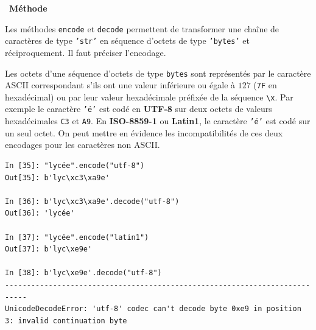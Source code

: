 \documentclass[a4paper, french, 12pt]{article}  %
\newenvironment{methode}[1]
{\par \medskip    \noindent  
 \begin {bclogo}[arrondi =0.1,logo=\bcoutil, marge=4,noborder = true] {~\textbf{Méthode}   {\itshape #1} }  \par}
{
\end{bclogo}
 \par \bigskip }
\begin{document}
\begin{methode}{}
Les méthodes \texttt{encode} et \texttt{decode} permettent de transformer une chaîne de caractères de type \texttt{'str'} en séquence d'octets de type \texttt{'bytes'} et réciproquement. Il faut préciser l'encodage.

{\small
\begin{center}

\end{center}
}

Les octets d'une séquence d'octets de type \texttt{bytes} sont représentés par le   caractère ASCII correspondant s'ils ont une valeur inférieure ou égale à $127$ (\texttt{7F} en hexadécimal) ou par leur  valeur hexadécimale préfixée de la séquence  \verb+\x+. Par exemple le caractère \texttt{'é'} est codé en \textbf{UTF-8} sur deux octets de valeurs hexadécimales \texttt{C3} et \texttt{A9}. En \textbf{ISO-8859-1} ou \textbf{Latin1}, le caractère \texttt{'é'} est codé sur un seul octet. On peut mettre en évidence les incompatibilités de ces deux encodages pour les caractères non ASCII.

\begin{lstlisting}[style=compil]
In [35]: "lycée".encode("utf-8")                                                                                     
Out[35]: b'lyc\xc3\xa9e'
 
In [36]: b'lyc\xc3\xa9e'.decode("utf-8")                                                                             
Out[36]: 'lycée'

In [37]: "lycée".encode("latin1")                                                                                    
Out[37]: b'lyc\xe9e'

In [38]: b'lyc\xe9e'.decode("utf-8")                                                                                 
---------------------------------------------------------------------------
UnicodeDecodeError: 'utf-8' codec can't decode byte 0xe9 in position 3: invalid continuation byte
\end{lstlisting}

\end{methode}
\end{document}
